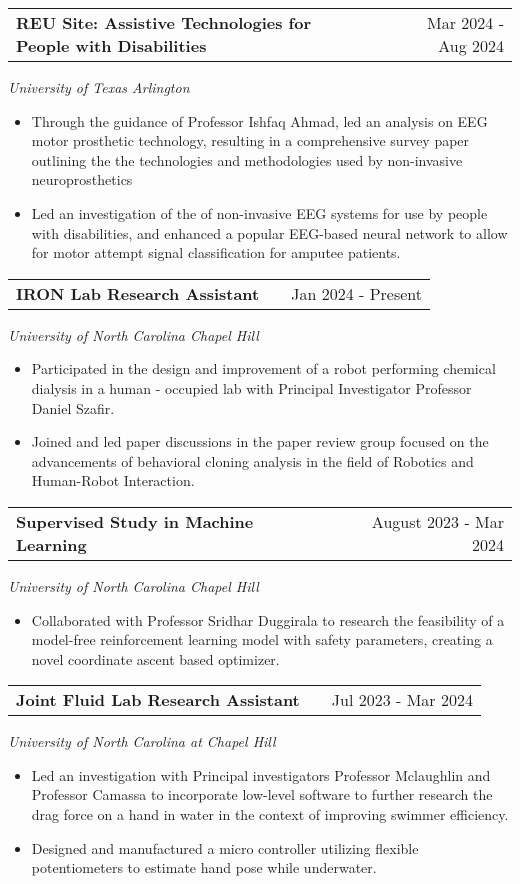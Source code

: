 \documentclass[a4paper,10pt]{article}
\makeatletter
\newenvironment{joblong}[3]
    {
    \begin{tabularx}{\linewidth}{@{}l X r@{}}
    \textbf{#1} & \hfill &  #2 \\[3.75pt]
    \end{tabularx}
    \begin{minipage}[t]{\linewidth}
    \textit{#3}
    
    \begin{itemize}[nosep,after=\strut, leftmargin=1em, itemsep=3pt,label=--]
    }
    {
    \end{itemize}
    \end{minipage}    
    }
\makeatother
\begin{document}
\begin{joblong}{REU Site: Assistive Technologies for People with Disabilities}{Mar 2024 - Aug 2024}{University of Texas Arlington}
\item Through the guidance of Professor Ishfaq Ahmad, led an analysis on EEG motor prosthetic technology, resulting in a comprehensive survey paper outlining the the technologies and methodologies used by non-invasive neuroprosthetics 
\item Led an investigation of the of non-invasive EEG systems for use by people with disabilities, and enhanced a popular EEG-based neural network to allow for motor attempt signal classification for amputee patients. 

\end{joblong}

\begin{joblong}{IRON Lab Research Assistant}{Jan 2024 - Present}{University of North Carolina Chapel Hill}
\item Participated in the design and improvement of a robot performing chemical dialysis in a human - occupied lab with Principal Investigator Professor Daniel Szafir.
\item Joined and led paper discussions in the paper review group focused on the advancements of behavioral cloning analysis in the field of Robotics and Human-Robot Interaction.

\end{joblong}

\begin{joblong}{Supervised Study in Machine Learning}{August 2023 - Mar 2024}{University of North Carolina Chapel Hill}
\item Collaborated with Professor Sridhar Duggirala to research the feasibility of a model-free reinforcement learning model with safety parameters, creating a novel coordinate ascent based optimizer.
\end{joblong}

\begin{joblong}{ Joint Fluid Lab Research Assistant}{Jul 2023 - Mar 2024}{University of North Carolina at Chapel Hill}
\item Led an investigation with Principal investigators Professor Mclaughlin and Professor Camassa to incorporate low-level software to further research the drag force on a hand in water in the context of improving swimmer efficiency.
\item Designed and manufactured a micro controller utilizing flexible potentiometers to estimate hand pose while underwater.
\end{joblong}
\end{document}
